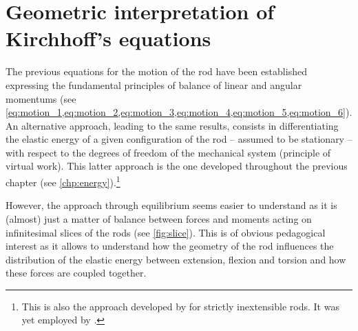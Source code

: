 \section{Geometric interpretation of Kirchhoff's equations}\label{sec:geointerp}

The previous equations for the motion of the rod have been established expressing the fundamental principles of balance of linear and angular momentums (see \cref{eq:motion_1,eq:motion_2,eq:motion_3,eq:motion_4,eq:motion_5,eq:motion_6}). An alternative approach, leading to the same results, consists in differentiating the elastic energy of a given configuration of the rod -- assumed to be stationary -- with respect to the degrees of freedom of the mechanical system (principle of virtual work). This latter approach is the one developed throughout the previous chapter (see \cref{chp:energy}).\footnote{This is also the approach developed by  for strictly inextensible rods. It was yet employed by .} 

However, the approach through equilibrium seems easier to understand as it is (almost) just a matter of balance between forces and moments acting on infinitesimal slices of the rods (see \cref{fig:slice}). This is of obvious pedagogical interest as it allows to understand how the geometry of the rod influences the distribution of the elastic energy between extension, flexion and torsion and how these forces are coupled together.

